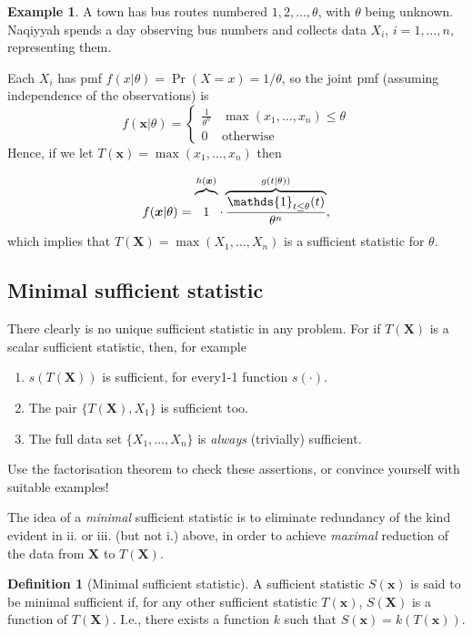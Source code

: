 \documentclass[
]{book}
\providecommand{\tightlist}{%
  \setlength{\itemsep}{0pt}\setlength{\parskip}{0pt}}
\newcommand{\bx}{{\boldsymbol x}}
\newcommand{\bX}{{\boldsymbol X}}
\DeclareMathOperator{\ind}{\mathds{1}}
\theoremstyle{definition}
\newtheorem{definition}{Definition}[chapter]
\theoremstyle{definition}
\newtheorem{example}{Example}[chapter]
\theoremstyle{definition}
\theoremstyle{definition}
\theoremstyle{remark}
\begin{document}
\begin{example}
A town has bus routes numbered \(1,2,\dots,\theta\), with \(\theta\) being unknown.
Naqiyyah spends a day observing bus numbers and collects data \(X_i\), \(i=1,\dots,n\), representing them.

Each \(X_i\) has pmf \(f(x|\theta) = \Pr(X=x) = 1/\theta\), so the joint pmf (assuming independence of the observations) is
\[
f(\bx|\theta) =
\begin{cases}
\frac{1}{\theta^n} &\max(x_1,\dots,x_n) \leq \theta \\
0 &\text{otherwise}
\end{cases}
\]
Hence, if we let \(T(\bx) = \max(x_1,\dots,x_n)\) then

\[
f(\bx|\theta) =
\overbrace{1 \vphantom{\frac{\ind_{t \leq \theta}(t)}{\theta^n}} }^{h(\bx)} 
\cdot
\overbrace{\frac{\ind_{t \leq \theta}(t)}{\theta^n}}^{g(t|\theta))},
\]
which implies that \(T(\bX)=\max(X_1,\dots,X_n)\) is a sufficient statistic for \(\theta\).
\end{example}

\hypertarget{minimal-sufficient-statistic}{%
\subsection{Minimal sufficient statistic}\label{minimal-sufficient-statistic}}

There clearly is no unique sufficient statistic in any problem.
For if \(T(\bX)\) is a scalar sufficient statistic, then, for example

\begin{enumerate}
\def\labelenumi{\roman{enumi}.}
\tightlist
\item
  \(s(T(\bX))\) is sufficient, for every1-1 function \(s(\cdot)\).
\item
  The pair \(\{T(\bX),X_1\}\) is sufficient too.
\item
  The full data set \(\{X_1,\dots,X_n\}\) is \emph{always} (trivially) sufficient.
\end{enumerate}

Use the factorisation theorem to check these assertions, or convince yourself with suitable examples!

The idea of a \emph{minimal} sufficient statistic is to eliminate redundancy of the kind evident in ii. or iii. (but not i.) above, in order to achieve \emph{maximal} reduction of the data from \(\bX\) to \(T(\bX)\).

\begin{definition}[Minimal sufficient statistic]
A sufficient statistic \(S(\bx)\) is said to be minimal sufficient if, for any other sufficient statistic \(T(\bx)\), \(S(\bX)\) is a function of \(T(\bX)\). I.e., there exists a function \(k\) such that \(S(\bx)=k(T(\bx))\).
\end{definition}
\end{document}
